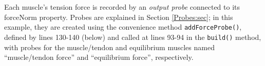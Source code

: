 Each muscle's tension force is recorded by an {\it output probe}
connected to its {\sf forceNorm} property. Probes are explained in
Section \ref{Probes:sec}; in this example, they are created using the
convenience method {\tt addForceProbe()}, defined by lines 130-140
(below) and called at lines 93-94 in the {\tt build()} method, with
probes for the muscle/tendon and equilibrium muscles named
``muscle/tendon force'' and ``equilibrium force'', respectively.

%
\lstset{numbers=left} 
\iflatexml

\else
{}

\fi
\lstset{numbers=none}
%

